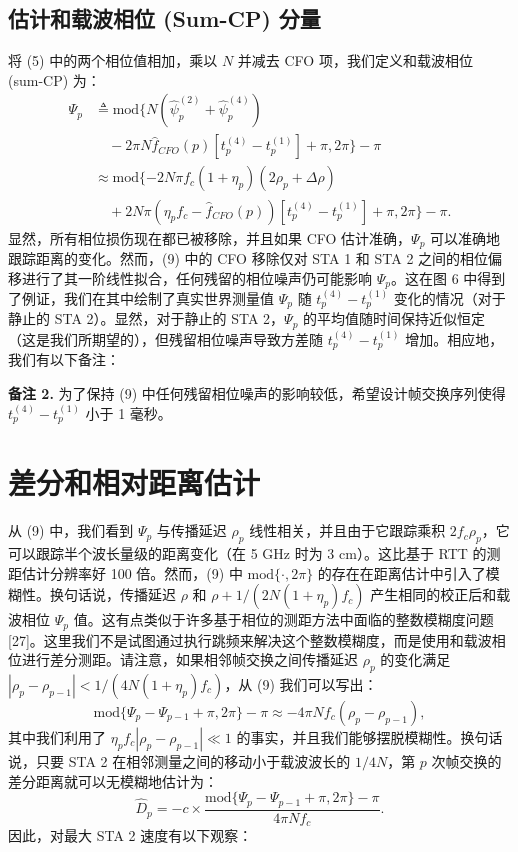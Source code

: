 \documentclass[journal]{IEEEtran}
\begin{document}
\subsection{估计和载波相位 (Sum-CP) 分量}
将 (5) 中的两个相位值相加，乘以 $N$ 并减去 CFO 项，我们定义和载波相位 (sum-CP) 为：
\begin{equation}
\begin{split}
\Psi_p &\triangleq \text{mod} \{ N(\hat{\psi}_p^{(2)} + \hat{\psi}_p^{(4)}) \\
&\quad - 2\pi N \hat{f}_{CFO}(p)[t_p^{(4)} - t_p^{(1)}] + \pi, 2\pi \} - \pi \\
&\approx \text{mod} \{ -2N\pi f_c (1+\eta_p)(2\rho_p + \Delta\rho) \\
&\quad + 2N\pi (\eta_p f_c - \hat{f}_{CFO}(p))[t_p^{(4)} - t_p^{(1)}] + \pi, 2\pi \} - \pi.
\end{split} \label{eq:9}
\end{equation}
显然，所有相位损伤现在都已被移除，并且如果 CFO 估计准确，$\Psi_p$ 可以准确地跟踪距离的变化。然而，(9) 中的 CFO 移除仅对 STA 1 和 STA 2 之间的相位偏移进行了其一阶线性拟合，任何残留的相位噪声仍可能影响 $\Psi_p$。这在图 6 中得到了例证，我们在其中绘制了真实世界测量值 $\Psi_p$ 随 $t_p^{(4)} - t_p^{(1)}$ 变化的情况（对于静止的 STA 2）。显然，对于静止的 STA 2，$\Psi_p$ 的平均值随时间保持近似恒定（这是我们所期望的），但残留相位噪声导致方差随 $t_p^{(4)} - t_p^{(1)}$ 增加。相应地，我们有以下备注：

\textbf{备注 2.} 为了保持 (9) 中任何残留相位噪声的影响较低，希望设计帧交换序列使得 $t_p^{(4)} - t_p^{(1)}$ 小于 1 毫秒。

\section{差分和相对距离估计}
从 (9) 中，我们看到 $\Psi_p$ 与传播延迟 $\rho_p$ 线性相关，并且由于它跟踪乘积 $2f_c \rho_p$，它可以跟踪半个波长量级的距离变化（在 5 GHz 时为 3 cm）。这比基于 RTT 的测距估计分辨率好 100 倍。然而，(9) 中 $\text{mod}\{\cdot, 2\pi\}$ 的存在在距离估计中引入了模糊性。换句话说，传播延迟 $\rho$ 和 $\rho + 1/(2N(1+\eta_p)f_c)$ 产生相同的校正后和载波相位 $\Psi_p$ 值。这有点类似于许多基于相位的测距方法中面临的整数模糊度问题 [27]。这里我们不是试图通过执行跳频来解决这个整数模糊度，而是使用和载波相位进行差分测距。请注意，如果相邻帧交换之间传播延迟 $\rho_p$ 的变化满足 $|\rho_p - \rho_{p-1}| < 1/(4N(1+\eta_p)f_c)$，从 (9) 我们可以写出：
\begin{equation}
\text{mod} \{ \Psi_p - \Psi_{p-1} + \pi, 2\pi \} - \pi \approx -4\pi N f_c (\rho_p - \rho_{p-1}), \label{eq:10}
\end{equation}
其中我们利用了 $\eta_p f_c |\rho_p - \rho_{p-1}| \ll 1$ 的事实，并且我们能够摆脱模糊性。换句话说，只要 STA 2 在相邻测量之间的移动小于载波波长的 $1/4N$，第 $p$ 次帧交换的差分距离就可以无模糊地估计为：
\begin{equation}
\hat{D}_p = -c \times \frac{\text{mod} \{ \Psi_p - \Psi_{p-1} + \pi, 2\pi \} - \pi}{4\pi N f_c}. \label{eq:11}
\end{equation}
因此，对最大 STA 2 速度有以下观察：
\end{document}
